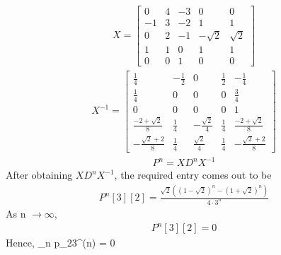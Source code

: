 \documentclass[journal,12pt,twocolumn]{IEEEtran}
\begin{document}
\begin{align}
    X = \left[\begin{array}{ccccc}0 & 4 & -3 & 0 & 0\\-1 & 3 & -2 & 1 & 1\\0 & 2 & -1 & - \sqrt{2} & \sqrt{2}\\1 & 1 & 0 & 1 & 1\\0 & 0 & 1 & 0 & 0\end{array}\right]
\end{align}
\begin{align}
    X^{-1} = \left[\begin{array}{ccccc}\frac{1}{4} & - \frac{1}{2} & 0 & \frac{1}{2} & - \frac{1}{4}\\\frac{1}{4} & 0 & 0 & 0 & \frac{3}{4}\\0 & 0 & 0 & 0 & 1\\\frac{-2 + \sqrt{2}}{8} & \frac{1}{4} & - \frac{\sqrt{2}}{4} & \frac{1}{4} & \frac{-2 + \sqrt{2}}{8}\\- \frac{\sqrt{2} + 2}{8} & \frac{1}{4} & \frac{\sqrt{2}}{4} & \frac{1}{4} & - \frac{\sqrt{2} + 2}{8}\end{array}\right]
\end{align}
\begin{align}
    P^{n} = X D^{n}X^{-1}
\end{align}
After obtaining $X D^{n}X^{-1}$, the required entry comes out to be
\begin{align}
    P^{n}[3][2] = \frac{\sqrt{2}\left(\left(1 - \sqrt{2}\right)^{n} - \left(1 + \sqrt{2}\right)^{n}\right)}{4\cdot3^{n}} 
\end{align}
As n $\rightarrow\infty$,
\begin{align}
    P^{n}[3][2] = 0
\end{align}
Hence,
  \lim _{n \rightarrow \infty} p_{23}^{(n)} = 0 
\end{document}
